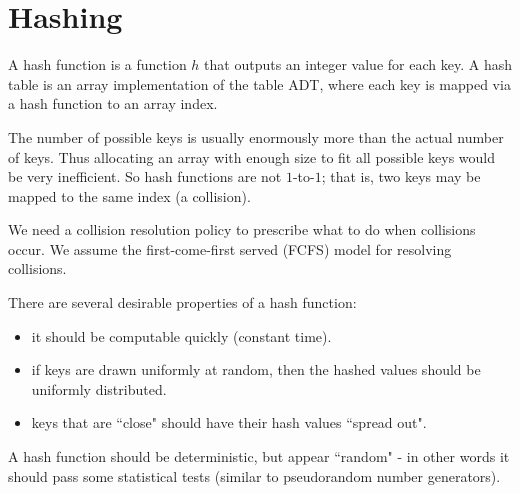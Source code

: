 \chapter{Hashing} %

\begin{Definition}
A {hash function} is a function $h$ that outputs an integer
value for each key. A {hash table} is an array implementation of
the table ADT, where each key is mapped via a hash function to an array
index. 
\end{Definition}

The number of possible keys is usually enormously more than
the actual number of keys. Thus allocating an array with enough size to
fit all possible keys would be very inefficient. So hash functions are
not $1$-to-$1$; that is, two keys may be mapped to the same index (a
{collision}). 

We need a collision resolution policy to prescribe what to do when 
collisions occur. We assume the first-come-first served (FCFS) model for resolving
collisions.

There are several desirable properties of a hash function:
\begin{itemize}
\item it should be computable quickly (constant time).
\item if keys are drawn uniformly at random, then the hashed values
should be uniformly distributed. 
\item keys that are ``close" should have their hash values ``spread out". 
\end{itemize}
A hash function should be deterministic, but appear ``random" - in other 
words it should pass some statistical tests (similar to pseudorandom number generators). 


